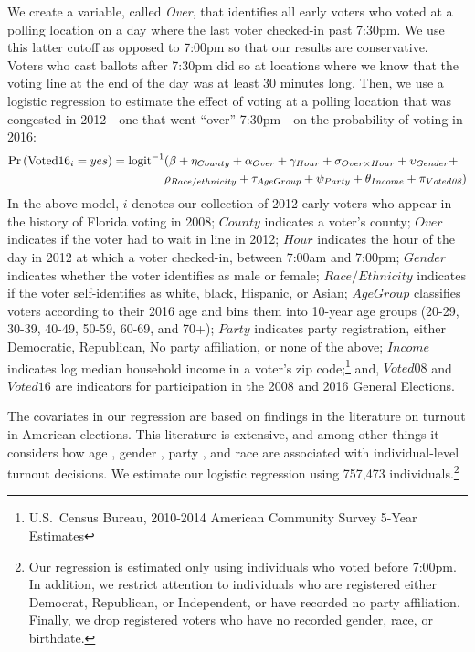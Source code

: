 \documentclass[12pt,titlepage]{article}
\begin{document}
We create a variable, called \emph{Over}, that identifies all early
voters who voted at a polling location on a day where the last voter
checked-in past 7:30pm. We use this latter cutoff as opposed to 7:00pm
so that our results are conservative. Voters who cast ballots after
7:30pm did so at locations where we know that the voting line at the
end of the day was at least 30 minutes long. Then, we use a logistic
regression to estimate the effect of voting at a polling location that
was congested in 2012---one that went ``over'' 7:30pm---on the
probability of voting in 2016: \begin{equation*}
  \begin{aligned}
    \textup{Pr}\left(\mathrm{Voted16}_{i} = yes\right) =
    \textup{logit}^{-1}&(\beta + \eta_{County} + \alpha_{Over} + \gamma_{Hour} +
    \sigma_{Over \times Hour} + \upsilon_{Gender}  + \\& \rho_{Race/ethnicity} +
      \tau_{Age Group} + \psi_{Party} + \theta_{Income} + \pi_{Voted\emph{08}})
  \end{aligned}  
\end{equation*}
%
In the above model, $i$ denotes our collection of 2012 early voters
who appear in the history of Florida voting in 2008; $County$
indicates a voter's county; $Over$ indicates if the voter had to wait
in line in 2012; $Hour$ indicates the hour of the day in 2012 at which
a voter checked-in, between 7:00am and 7:00pm; $Gender$ indicates
whether the voter identifies as male or female; $Race/Ethnicity$
indicates if the voter self-identifies as white, black, Hispanic, or
Asian; $Age Group$ classifies voters according to their 2016 age and
bins them into 10-year age groups (20-29, 30-39, 40-49, 50-59, 60-69,
and 70+); $Party$ indicates party registration, either Democratic,
Republican, No party affiliation, or none of the above; $Income$
indicates log median household income in a voter's zip
code;\footnote{U.S.\ Census Bureau, 2010-2014 American Community
  Survey 5-Year Estimates} and, $Voted08$ and $Voted16$ are indicators
for participation in the 2008 and 2016 General Elections.

The covariates in our regression are based on findings in the
literature on turnout in American elections. This literature is
extensive, and among other things it considers how age
\citep{strateetal:age,hightonwolfinger:lifecycle}, gender
\citep{schlozman:genderdifferentvoice}, party
\citep{martinezgill:partisanturnout,grofmanetal:turnout}, and race
\citep{verbaetal:raceparticipation,fraga:raceturnout} are associated
with individual-level turnout decisions. We estimate our logistic
regression using 757,473 individuals.\footnote{Our regression is
  estimated only using individuals who voted before 7:00pm.  In
  addition, we restrict attention to individuals who are registered
  either Democrat, Republican, or Independent, or have recorded no
  party affiliation.  Finally, we drop registered voters who have no
  recorded gender, race, or birthdate.}
\end{document}
